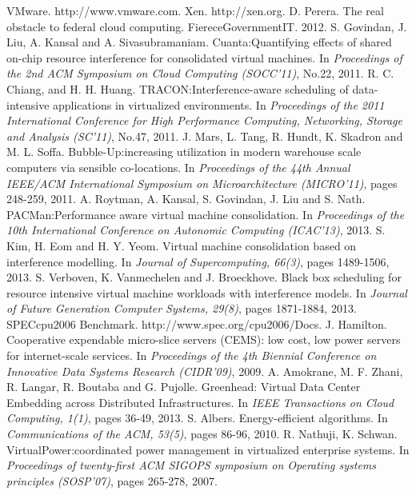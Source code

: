 \documentclass[10pt,journal]{IEEEtran}
\begin{document}
\begin{thebibliography}{99}
\small
{}
VMware. http://www.vmware.com.
Xen. http://xen.org.
D. Perera. The real obstacle to federal cloud computing. FiereceGovernmentIT. 2012. 
S. Govindan, J. Liu, A. Kansal and A. Sivasubramaniam. Cuanta:Quantifying effects of shared on-chip resource interference for consolidated virtual machines. In \emph{Proceedings of the 2nd ACM Symposium on Cloud Computing (SOCC{'}11)}, No.22, 2011.
R. C. Chiang, and H. H. Huang. TRACON:Interference-aware scheduling of data-intensive applications in virtualized environments. In \emph{Proceedings of the 2011 International Conference for High Performance Computing, Networking, Storage and Analysis (SC{'}11)}, No.47, 2011.
J. Mars, L. Tang, R. Hundt, K. Skadron and M. L. Soffa. Bubble-Up:increasing utilization in modern warehouse scale computers via sensible co-locations. In \emph{Proceedings of the 44th Annual IEEE/ACM International Symposium on Microarchitecture (MICRO{'}11)}, pages 248-259, 2011.
A. Roytman, A. Kansal, S. Govindan, J. Liu and S. Nath. PACMan:Performance aware virtual machine consolidation. In \emph{Proceedings of the 10th International Conference on Autonomic Computing (ICAC{'}13)}, 2013.
S. Kim, H. Eom and H. Y. Yeom. Virtual machine consolidation based on interference modelling. In \emph{Journal of Supercomputing, 66(3)}, pages 1489-1506, 2013.
S. Verboven, K. Vanmechelen and J. Broeckhove. Black box scheduling for resource intensive virtual machine workloads with interference models. In \emph{Journal of Future Generation Computer Systems, 29(8)}, pages 1871-1884, 2013.
SPECcpu2006 Benchmark. http://www.spec.org/cpu2006/Docs.
J. Hamilton. Cooperative expendable micro-slice servers (CEMS): low cost, low power servers for internet-scale services. In \emph{Proceedings of the 4th Biennial Conference on Innovative Data Systems Research (CIDR{'}09)}, 2009.
A. Amokrane, M. F. Zhani, R. Langar, R. Boutaba and G. Pujolle. Greenhead: Virtual Data Center Embedding across Distributed Infrastructures. In \emph{IEEE Transactions on Cloud Computing, 1(1)}, pages 36-49, 2013.
S. Albers. Energy-efficient algorithms. In \emph{Communications of the ACM, 53(5)}, pages 86-96, 2010.
R. Nathuji, K. Schwan. VirtualPower:coordinated power management in virtualized enterprise systems. In \emph{Proceedings of twenty-first ACM SIGOPS symposium on Operating systems principles (SOSP{'}07)}, pages 265-278, 2007.

\end{thebibliography}
\end{document}

